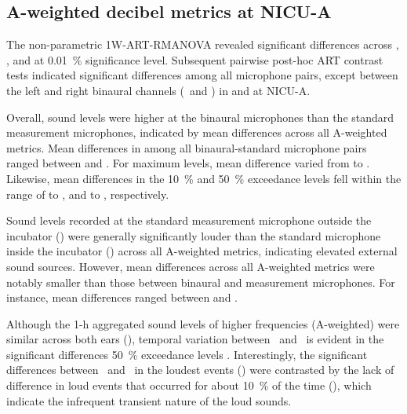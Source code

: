 

\subsection{A-weighted decibel metrics at NICU-A}

The non-parametric 1W-ART-RMANOVA revealed significant differences across , ,  and  at \SI{0.01}{\percent} significance level. Subsequent pairwise post-hoc ART contrast tests indicated significant differences among all microphone pairs, except between the left and right binaural channels (\binL\ and \binR) in  and  at NICU-A.  

Overall, sound levels were higher at the binaural microphones than the standard measurement microphones, indicated by mean differences across all A-weighted metrics. Mean differences in  among all binaural-standard microphone pairs ranged between  and  \dba{}. For maximum levels, mean difference varied from  to  \dba{}. Likewise, mean differences in the \SI{10}{\percent} and \SI{50}{\percent} exceedance levels fell within the range of  to  \dba{}, and  to  \dba{}, respectively.

Sound levels recorded at the standard measurement microphone outside the incubator (\GRASOut) were generally significantly louder than the standard microphone inside the incubator (\GRASIn) across all A-weighted metrics,  indicating elevated external sound sources. However, mean differences across all A-weighted metrics were notably smaller than those between binaural and measurement microphones. For instance, mean differences ranged between  and  \dba{}.

Although the 1-h aggregated sound levels of higher frequencies (A-weighted) were similar across both ears (), temporal variation between \binL\ and \binR\ is evident in the significant differences \SI{50}{\percent} exceedance levels  \dba{}. Interestingly, the significant differences between \binL\ and \binR\ in the loudest events () were contrasted by the lack of difference in loud events that occurred for about \SI{10}{\percent} of the time (), which indicate the infrequent transient nature of the loud sounds.

